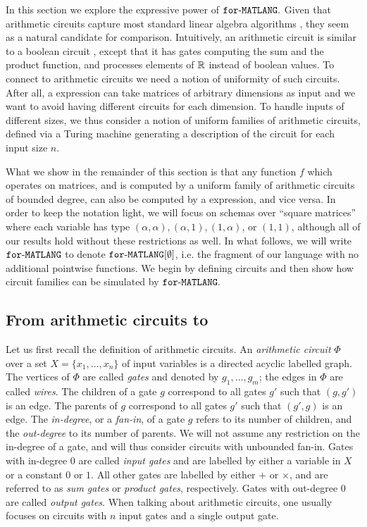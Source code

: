 In this section we explore the expressive power of $\texttt{for}\text{-}\texttt{MATLANG}.$ Given that arithmetic circuits \cite{allender} capture most standard linear algebra algorithms \cite{Raz02,ShpilkaY10}, they seem as a natural candidate for comparison. Intuitively, an arithmetic circuit is similar to a boolean circuit \cite{aroraB2009}, except that it has gates computing the sum and the product function, and processes elements of $\mathbb{R}$ instead of boolean values. To connect \langfor to arithmetic circuits we need a notion of uniformity of such circuits. After all, a \langfor expression can take matrices of arbitrary dimensions as input and we want to avoid having  different circuits for each dimension. To handle inputs of different sizes, we thus consider a notion of uniform families of arithmetic circuits, defined via a Turing machine generating a description of the circuit for each input size $n$.

What we show in the remainder of this section is that any function $f$ which operates on matrices, and is computed by a uniform family of arithmetic circuits of bounded degree, can also be computed by a \langfor expression, and vice versa. In order to keep the notation light, we will focus on 
 \langfor schemas over ``square matrices'' where each variable has type $(\alpha,\alpha),(\alpha,1),(1,\alpha)$, or $(1,1)$, although all of our results hold without these restrictions as well. In what follows, we will write $\texttt{for}\text{-}\texttt{MATLANG}$ to denote $\texttt{for}\text{-}\texttt{MATLANG}[\emptyset]$, i.e. the fragment of our language with no additional pointwise functions. We begin by defining circuits and then show how circuit families can be simulated by $\texttt{for}\text{-}\texttt{MATLANG}.$

\subsection{From arithmetic circuits to \langfor}

Let us first recall the definition of arithmetic circuits. 
An \textit{arithmetic circuit} $\Phi$ over a set $X=\{x_1,\ldots,x_n\}$ of input variables is a directed
acyclic labelled graph. The vertices of $\Phi$ are called \textit{gates} and denoted by $g_1,\ldots,g_m$;
the edges in $\Phi$ are called \textit{wires}. The children of a gate $g$ correspond to all gates
$g'$ such that $(g,g')$ is an edge. The parents of $g$ correspond to all gates $g'$ 
such that $(g',g)$ is an edge. The \textit{in-degree}, or a \textit{fan-in}, of a gate $g$ refers to its number of children, and 
the \textit{out-degree} to its number of parents. We will not assume any restriction on the in-degree of a gate, and will thus consider circuits with unbounded fan-in. Gates with in-degree $0$ are called \textit{input gates}
and are labelled by either a variable in $X$ or a constant $0$ or $1$. All other gates
are labelled by either $+$ or $\times$, and are referred to as \textit{sum gates} or \textit{product gates}, respectively.
Gates with out-degree $0$ are called \textit{output gates}. When talking about arithmetic circuits, one usually focuses on circuits with $n$ input gates and a single output gate.

